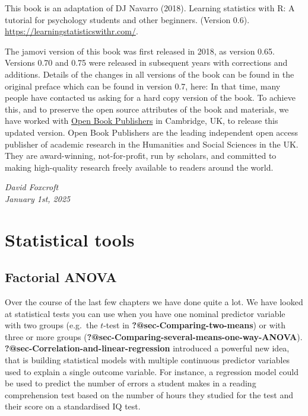 \documentclass[
  a4paper,
]{book}
\begin{document}

This book is an adaptation of DJ Navarro (2018). Learning statistics
with R: A tutorial for psychology students and other beginners. (Version
0.6). \url{https://learningstatisticswithr.com/}.

The jamovi version of this book was first released in 2018, as version
0.65. Versions 0.70 and 0.75 were released in subsequent years with
corrections and additions. Details of the changes in all versions of the
book can be found in the original preface which can be found in version
0.7, here: In that time, many people have contacted us asking for a hard
copy version of the book. To achieve this, and to preserve the open
source attributes of the book and materials, we have worked with
\href{https://www.openbookpublishers.com/books/10.11647/obp.0333}{Open
Book Publishers} in Cambridge, UK, to release this updated version. Open
Book Publishers are the leading independent open access publisher of
academic research in the Humanities and Social Sciences in the UK. They
are award-winning, not-for-profit, run by scholars, and committed to
making high-quality research freely available to readers around the
world.

\emph{David Foxcroft\\
January 1st, 2025}

\part{Statistical tools}

\hypertarget{sec-Factorial-ANOVA}{%
\chapter{Factorial ANOVA}\label{sec-Factorial-ANOVA}}

Over the course of the last few chapters we have done quite a lot. We
have looked at statistical tests you can use when you have one nominal
predictor variable with two groups (e.g.~the \(t\)-test in
\textbf{?@sec-Comparing-two-means}) or with three or more groups
(\textbf{?@sec-Comparing-several-means-one-way-ANOVA}).
\textbf{?@sec-Correlation-and-linear-regression} introduced a powerful
new idea, that is building statistical models with multiple continuous
predictor variables used to explain a single outcome variable. For
instance, a regression model could be used to predict the number of
errors a student makes in a reading comprehension test based on the
number of hours they studied for the test and their score on a
standardised IQ test.
\end{document}
